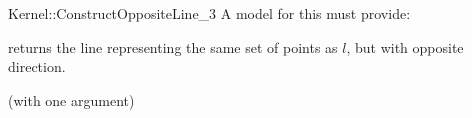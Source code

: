 \begin{ccRefFunctionObjectConcept}{Kernel::ConstructOppositeLine_3}
A model for this must provide:


{returns the line representing the same set of points as $l$,
but with opposite direction.}

\ccRefines
{} (with one argument)

\ccSeeAlso
{} \\

\end{ccRefFunctionObjectConcept}
